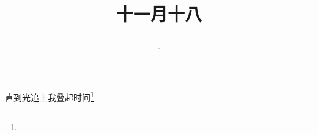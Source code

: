 \title{\date[d=18,m=12,y=2024][year:cn-y,年,month:cn,day:cn,日,·,weekday]·十一月十八 }
直到光追上我叠起时间\footnote{ }

